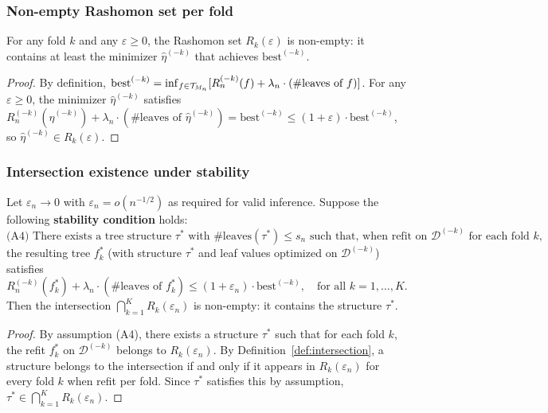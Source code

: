 \documentclass[12pt]{article}
\begin{document}
\subsubsection{Non-empty Rashomon set per fold}

\begin{lemma}
\label{lem:rashomon-nonempty}
For any fold $k$ and any $\varepsilon \ge 0$, the Rashomon set $R_k(\varepsilon)$ is non-empty: it contains at least the minimizer $\hat\eta^{(-k)}$ that achieves $\text{best}^{(-k)}$.
\end{lemma}
\begin{proof}
By definition, $\text{best}^{(-k)} = \inf_{f \in \mathcal{T}_{M_n}} [ R_n^{(-k)}(f) + \lambda_n \cdot (\#\text{leaves of } f) ]$. For any $\varepsilon \ge 0$, the minimizer $\hat\eta^{(-k)}$ satisfies $R_n^{(-k)}(\hat\eta^{(-k)}) + \lambda_n \cdot (\#\text{leaves of } \hat\eta^{(-k)}) = \text{best}^{(-k)} \le (1+\varepsilon) \cdot \text{best}^{(-k)}$, so $\hat\eta^{(-k)} \in R_k(\varepsilon)$.
\end{proof}

\subsubsection{Intersection existence under stability}

\begin{theorem}
\label{thm:intersection-existence}
Let $\varepsilon_n \to 0$ with $\varepsilon_n = o(n^{-1/2})$ as required for valid inference. Suppose the following \textbf{stability condition} holds:
\begin{equation}
\label{eq:stability}
\text{(A4) There exists a tree structure } \tau^* \text{ with } \#\text{leaves}(\tau^*) \le s_n \text{ such that, when refit on } \mathcal{D}^{(-k)} \text{ for each fold } k,
\end{equation}
the resulting tree $f_k^*$ (with structure $\tau^*$ and leaf values optimized on $\mathcal{D}^{(-k)}$) satisfies
\[
R_n^{(-k)}(f_k^*) + \lambda_n \cdot (\#\text{leaves of } f_k^*) \le (1+\varepsilon_n) \cdot \text{best}^{(-k)}, \quad \text{for all } k = 1, \ldots, K.
\]
Then the intersection $\bigcap_{k=1}^K R_k(\varepsilon_n)$ is non-empty: it contains the structure $\tau^*$.
\end{theorem}

\begin{proof}
By assumption (A4), there exists a structure $\tau^*$ such that for each fold $k$, the refit $f_k^*$ on $\mathcal{D}^{(-k)}$ belongs to $R_k(\varepsilon_n)$. By Definition~\ref{def:intersection}, a structure belongs to the intersection if and only if it appears in $R_k(\varepsilon_n)$ for every fold $k$ when refit per fold. Since $\tau^*$ satisfies this by assumption, $\tau^* \in \bigcap_{k=1}^K R_k(\varepsilon_n)$.
\end{proof}
\end{document}
